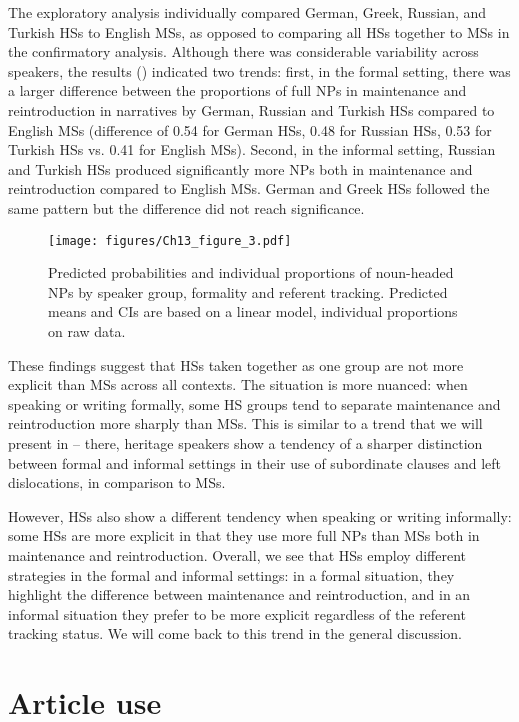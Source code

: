 \documentclass[output=paper,colorlinks,citecolor=brown]{langscibook}
\begin{document}
The exploratory analysis individually compared German, Greek, Russian, and Turkish HSs to English MSs, as opposed to comparing all HSs together to MSs in the confirmatory analysis. Although there was considerable variability across speakers, the results () indicated two trends: first, in the formal setting, there was a larger difference between the proportions of full NPs in maintenance and reintroduction in narratives by German, Russian and Turkish HSs compared to English MSs (difference of 0.54 for German HSs, 0.48 for Russian HSs, 0.53 for Turkish HSs vs. 0.41 for English MSs). Second, in the informal setting, Russian and Turkish HSs produced significantly more NPs both in maintenance and reintroduction compared to English MSs. German and Greek HSs followed the same pattern but the difference did not reach significance.

\begin{figure}
    \texttt{[image: figures/Ch13\_figure\_3.pdf]}
    \caption{Predicted probabilities and individual proportions of noun-headed NPs by speaker group, formality and referent tracking. Predicted means and CIs are based on a linear model, individual proportions on raw data.}
    \label{fig:pashkovaetal:3}
\end{figure}
 
These findings suggest that HSs taken together as one group are not more explicit than MSs across all contexts. The situation is more nuanced: when speaking or writing formally, some HS groups tend to separate maintenance and reintroduction more sharply than MSs. This is similar to a trend that we will present in  -- there, heritage speakers show a tendency of a sharper distinction between formal and informal settings in their use of subordinate clauses and left dislocations, in comparison to MSs.

However, HSs also show a different tendency when speaking or writing informally: some HSs are more explicit in that they use more full NPs than MSs both in maintenance and reintroduction. Overall, we see that HSs employ different strategies in the formal and informal settings: in a formal situation, they highlight the difference between maintenance and reintroduction, and in an informal situation they prefer to be more explicit regardless of the referent tracking status. We will come back to this trend in the general discussion.


\section{Article use} \label{sec:pashkovaetal:Articles}
\end{document}
